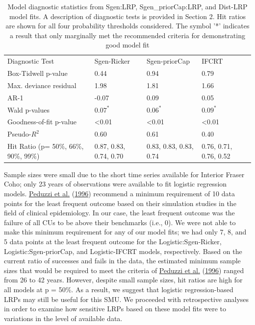 \documentclass[11pt]{book}
\begin{document}
\renewcommand*{\arraystretch}{1.5}
\begin{table}[ht]
\centering
\caption{Model diagnostic statistics from Sgen:LRP, Sgen_priorCap:LRP, and Dist-LRP model fits. A description of diagnostic tests is provided in Section 2. Hit ratios are shown for all four probability thresholds considered.  The symbol '*' indicates a result that only marginally met the recommended criteria for demonstrating good model fit}
\begin{tabular}{p{2.5cm} p{2.5cm} p{2.5cm} p{2.5cm}}
\hline  
 Diagnostic Test  & Sgen-Ricker  & Sgen-priorCap & IFCRT \\
 Box-Tidwell p-value     & 0.44  & 0.94  & 0.79   \\
 Max. deviance residual  & 1.98  & 1.81  & 1.66   \\
 AR-1                    & -0.07 & 0.09  & 0.05   \\
 Wald p-values           & $0.07^*$& $0.06^*$& $0.09^*$ \\
 Goodness-of-fit p-value & <0.01 & <0.01 & <0.01  \\
 Pseudo-$R^2$            & 0.60  & 0.61  & 0.40   \\
 Hit Ratio (p= 50\%, 66\%, 90\%, 99\%) & 0.87, 0.83, 0.74, 0.70  & 0.83, 0.83, 0.83, 0.74 &  0.76, 0.71, 0.76, 0.52 \\
\hline
\end{tabular}
\label{tab:holt-tab6}
\end{table}
Sample sizes were small due to the short time series available for Interior Fraser Coho; only 23 years of observations were available to fit logistic regression models. \protect\hyperlink{ref-peduzziSimulationStudyNumber1996}{Peduzzi et al.} (\protect\hyperlink{ref-peduzziSimulationStudyNumber1996}{1996}) recommend a minimum requirement of 10 data points for the least frequent outcome based on their simulation studies in the field of clinical epidemiology. In our case, the least frequent outcome was the failure of all CUs to be above their benchmarks (i.e., 0). We were not able to make this minimum requirement for any of our model fits; we had only 7, 8, and 5 data points at the least frequent outcome for the Logistic:Sgen-Ricker, Logistic:Sgen-priorCap, and Logistic-IFCRT models, respectively. Based on the current ratio of successes and fails in the data, the estimated minimum sample sizes that would be required to meet the criteria of \protect\hyperlink{ref-peduzziSimulationStudyNumber1996}{Peduzzi et al.} (\protect\hyperlink{ref-peduzziSimulationStudyNumber1996}{1996}) ranged from 26 to 42 years. However, despite small sample sizes, hit ratios are high for all models at p = 50\%. As a result, we suggest that logistic regression-based LRPs may still be useful for this SMU. We proceeded with retrospective analyses in order to examine how sensitive LRPs based on these model fits were to variations in the level of available data.
\end{document}
